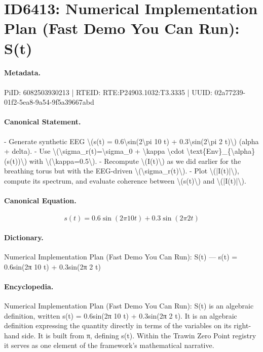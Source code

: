\section*{ID6413: Numerical Implementation Plan (Fast Demo You Can Run): S(t)}
\paragraph{Metadata.}
PiID: 6082503930213 | RTEID: RTE:P24903.1032:T3.3335 | UUID: 02a77239-01f2-5ea8-9a54-9f5a39667abd

\paragraph{Canonical Statement.}
- Generate synthetic EEG \textbackslash{}(s(t) = 0.6\textbackslash{}sin(2\textbackslash{}pi 10 t) + 0.3\textbackslash{}sin(2\textbackslash{}pi 2 t)\textbackslash{}) (alpha + delta). - Use \textbackslash{}(\textbackslash{}sigma\_r(t)=\textbackslash{}sigma\_0 + \textbackslash{}kappa \textbackslash{}cdot \textbackslash{}text\{Env\}\_\{\textbackslash{}alpha\}(s(t))\textbackslash{}) with \textbackslash{}(\textbackslash{}kappa=0.5\textbackslash{}). - Recompute \textbackslash{}(I(t)\textbackslash{}) as we did earlier for the breathing torus but with the EEG-driven \textbackslash{}(\textbackslash{}sigma\_r(t)\textbackslash{}). - Plot \textbackslash{}(|I(t)|\textbackslash{}), compute its spectrum, and evaluate coherence between \textbackslash{}(s(t)\textbackslash{}) and \textbackslash{}(|I(t)|\textbackslash{}).

\paragraph{Canonical Equation.}
\[
s(t) = 0.6\sin(2\pi 10 t) + 0.3\sin(2\pi 2 t)
\]

\paragraph{Dictionary.}
Numerical Implementation Plan (Fast Demo You Can Run): S(t) — s(t) = 0.6sin(2π 10 t) + 0.3sin(2π 2 t)

\paragraph{Encyclopedia.}
Numerical Implementation Plan (Fast Demo You Can Run): S(t) is an algebraic definition, written s(t) = 0.6sin(2π 10 t) + 0.3sin(2π 2 t). It is an algebraic definition expressing the quantity directly in terms of the variables on its right-hand side. It is built from π, defining s(t). Within the Trawin Zero Point registry it serves as one element of the framework's mathematical narrative.
